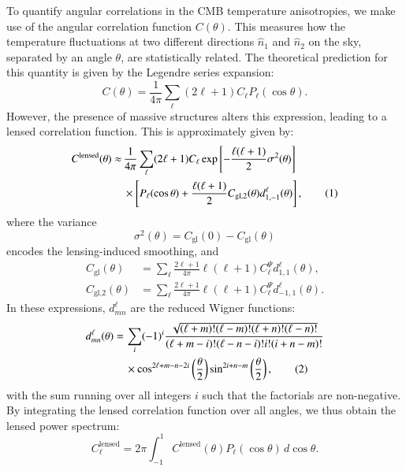 \documentclass{aa}
\newcommand\numberthis{\addtocounter{equation}{1}\tag{\theequation}}
\numberwithin{equation}{section}
\numberwithin{table}{section}
\numberwithin{figure}{section}
\begin{document}
To quantify angular correlations in the CMB temperature anisotropies, we make use of the angular correlation function $C(\theta)$. This measures how the temperature fluctuations at two different directions $\hat{n}_1$ and $\hat{n}_2$ on the sky, separated by an angle $\theta$, are statistically related. The theoretical prediction for this quantity is given by the Legendre series expansion:
\begin{equation}
C(\theta) = \frac{1}{4\pi} \sum_\ell (2\ell + 1) C_\ell P_\ell(\cos\theta).
\end{equation}
However, the presence of massive structures alters this expression, leading to a lensed correlation function. This is approximately given by:
\begin{align*}
C^\text{lensed}(\theta) \approx \,&\frac{1}{4\pi} \sum_\ell (2\ell + 1) C_\ell \exp\left[-\frac{\ell(\ell+1)}{2}\sigma^2(\theta)\right] \\
 &\times\left[ P_\ell(\cos\theta) + \frac{\ell(\ell+1)}{2} C_\text{gl,2}(\theta) d^{\ell}_{1,-1}(\theta) \right], \numberthis
\end{align*}
where the variance
\begin{equation}
  \sigma^2(\theta) = C_\text{gl}(0)-C_\text{gl}(\theta)
\end{equation}
encodes the lensing-induced smoothing, and
\begin{align}
  C_\text{gl}(\theta) &= \sum_\ell \frac{2\ell + 1}{4\pi} \ell(\ell+1) C_\ell^\Psi d_{1,1}^\ell(\theta),
  \\
  C_\text{gl,2}(\theta) &= \sum_\ell \frac{2\ell + 1}{4\pi} \ell(\ell+1) C_\ell^\Psi d_{-1,1}^\ell(\theta).
\end{align}
In these expressions, $d_{mn}^\ell$ are the reduced Wigner functions: 
\begin{align*}
  d^\ell_{mn}(\theta) =\,& \sum_i (-1)^i  \frac{\sqrt{(\ell + m)! (\ell - m)! (\ell + n)! (\ell - n)!}}{(\ell + m - i)! (\ell - n - i)! i! (i + n - m)!} \\
  &\times\cos^{2\ell + m - n - 2i}\left(\frac{\theta}{2}\right) \sin^{2i + n - m}\left(\frac{\theta}{2}\right), \numberthis
\end{align*}
with the sum running over all integers $i$ such that the factorials are non-negative. 
By integrating the lensed correlation function over all angles, we thus obtain the lensed power spectrum:
\begin{equation}
C_\ell^{\text{lensed}} = 2\pi \int_{-1}^{1} C^\text{lensed}(\theta) P_\ell(\cos\theta) \, d\cos\theta.
\end{equation}
\end{document}
